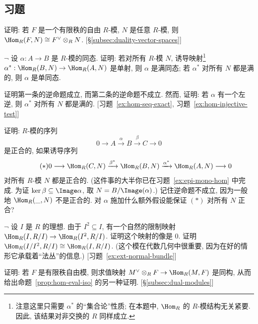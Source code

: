 \subsection*{习题}
{}

\begin{prob}\label{ex:hom-free-tensor}
证明: 若 $F$ 是一个有限秩的自由 $R$-模, $N$ 是任意 $R$-模, 则 $\Hom_R(F,N)\cong F^\vee\otimes_R N$. [\S\ref{subsec:duality-vector-spaces}]
\end{prob}

\begin{prob}\label{ex:epi-mono-hom}
$\neg$ 设 $\alpha:A\to B$ 是 $R$-模的同态. 证明: 若对所有 $R$-模 $N$, 诱导映射\footnote{注意这里只需要 $\alpha^*$ 的``集合论''性质; 在本题中, $\Hom_R$ 的 $R$-模结构无关紧要. 因此, 该结果对非交换的 $R$ 同样成立.} $\alpha^*:\Hom_R(B,N)\to\Hom_R(A,N)$ 是单射, 则 $\alpha$ 是满同态; 若 $\alpha^*$ 对所有 $N$ 都是满的, 则 $\alpha$ 是单同态.

证明第一条的逆命题成立, 而第二条的逆命题不成立. 然而, 证明: 若 $\alpha$ 有一个左逆, 则 $\alpha^*$ 对所有 $N$ 都是满的. [习题~\ref{ex:hom-seq-exact}, 习题~\ref{ex:hom-injective-test}]
\end{prob}

\begin{prob}\label{ex:hom-seq-exact}
证明: $R$-模的序列
\[
0\longrightarrow A\xrightarrow{\alpha} B\xrightarrow{\beta} C\longrightarrow 0
\]
是正合的, 如果诱导序列
\begin{equation*}\tag{$*$}
0\longrightarrow\Hom_R(C,N)\xrightarrow{\beta^*}\Hom_R(B,N)\xrightarrow{\alpha^*}\Hom_R(A,N)\longrightarrow 0
\end{equation*}
对所有 $R$-模 $N$ 都是正合的. (这件事的大半你已在习题~\ref{ex:epi-mono-hom} 中完成. 为证 $\ker\beta\subseteq\Image\alpha$, 取 $N=B/\Image(\alpha)$.) 记住逆命题不成立, 因为一般地 $\Hom_R(\_,N)$ 不是正合的. 对 $\alpha$ 施加什么额外假设能保证 $(*)$ 对所有 $N$ 正合?
\end{prob}

\begin{prob}\label{ex:normal-bundle-ideal}
$\neg$ 设 $I$ 是 $R$ 的理想. 由于 $I^2\subseteq I$, 有一个自然的限制映射 $\Hom_R(I,R/I)\to\Hom_R(I^2,R/I)$. 证明这个映射的像是 $0$. 证明 $\Hom_R(I/I^2,R/I)\cong\Hom_R(I,R/I)$. (这个模在代数几何中很重要, 因为在好的情形它承载着``法丛''的信息.) [习题~\ref{ex:ext-normal-bundle}]
\end{prob}

\begin{prob}\label{ex:eval-iso-free}
证明: 若 $F$ 是有限秩自由模, 则求值映射 $M^\vee\otimes_R F\to\Hom_R(M,F)$ 是同构, 从而给出命题~\ref{prop:hom-eval-iso} 的另一种证明. [\S\ref{subsec:dual-modules}]
\end{prob}

